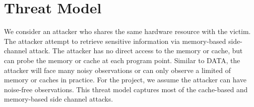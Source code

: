 \section{Threat Model}
We consider an attacker who shares the same hardware resource with the victim. 
The attacker attempt to retrieve sensitive information via memory-based side-channel attack. 
The attacker has no direct access to the memory or cache, but can probe the memory 
or cache at each program point. Similar to DATA, the attacker will face many 
noisy observations or can only observe a limited of memory or caches in practice. 
For the project, we assume the attacker can have noise-free observations. 
This threat model captures most of the cache-based and memory-based side channel attacks.
